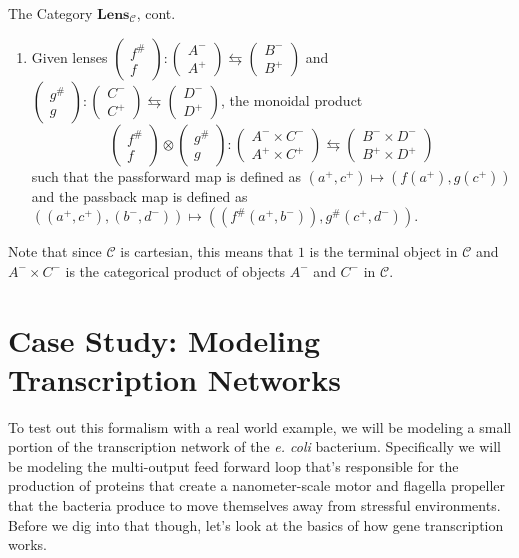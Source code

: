 \documentclass[12pt]{article}
\newcounter{examp}
\begin{document}
\begin{definition*}{The Category $\textbf{Lens}_\mathcal{C}$, cont.}{}
\begin{enumerate}
    \item Given lenses $\begin{pmatrix}f^{\#}\\f\end{pmatrix}:\begin{pmatrix}A^-\\A^+\end{pmatrix}\leftrightarrows\begin{pmatrix}B^-\\B^+\end{pmatrix}$
          and $\begin{pmatrix}g^{\#}\\g\end{pmatrix}:\begin{pmatrix}C^-\\C^+\end{pmatrix}\leftrightarrows\begin{pmatrix}D^-\\D^+\end{pmatrix}$, the monoidal product
          $$\begin{pmatrix}f^{\#}\\f\end{pmatrix} \otimes \begin{pmatrix}g^{\#}\\g\end{pmatrix}:\begin{pmatrix}A^- \times C^-\\A^+ \times C^+\end{pmatrix}\leftrightarrows\begin{pmatrix}B^- \times D^-\\B^+ \times D^+\end{pmatrix}$$
          such that the passforward map is defined as $(a^+, c^+) \mapsto (f(a^+), g(c^+))$ and the passback map is defined as $((a^+, c^+), (b^-, d^-)) \mapsto ((f^\#(a^+, b^-)), g^\#(c^+, d^-))$.
  \end{enumerate}

  Note that since $\mathcal{C}$ is cartesian, this means that $1$ is the terminal object in $\mathcal{C}$ and $A^- \times C^-$ is the categorical product of objects $A^-$ and $C^-$ in $\mathcal{C}$.
\end{definition*}





\section*{Case Study: Modeling Transcription Networks}
To test out this formalism with a real world example, we will be modeling a small portion of the transcription network of the \textit{e. coli} bacterium.
Specifically we will be modeling the multi-output feed forward loop that's responsible for the production of proteins that create a nanometer-scale motor and flagella propeller that the bacteria produce to move themselves away from stressful environments.
Before we dig into that though, let's look at the basics of how gene transcription works.
\end{document}
